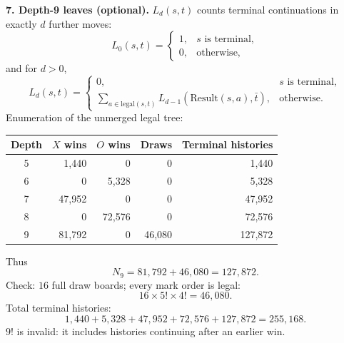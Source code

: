 \documentclass[11pt,a4paper]{article}
\begin{document}
\textbf{7. Depth-9 leaves (optional).} $L_d(s,t)$ counts terminal continuations in exactly $d$ further moves:
\[
L_0(s,t)=\begin{cases}1,&s\text{ is terminal},\\0,&\text{otherwise},\end{cases}
\]
and for $d>0$,
\[
L_d(s,t)=\begin{cases}
0,&s\text{ is terminal},\\
\displaystyle\sum_{a\in\mathrm{legal}(s,t)}L_{d-1}(\mathrm{Result}(s,a),\bar t),&\text{otherwise}.
\end{cases}
\]
Enumeration of the unmerged legal tree:
\begin{center}\begin{tabular}{c|r|r|r|r}\toprule
Depth&$X$ wins&$O$ wins&Draws&Terminal histories\\\midrule
5&1,440&0&0&1,440\\
6&0&5,328&0&5,328\\
7&47,952&0&0&47,952\\
8&0&72,576&0&72,576\\
9&81,792&0&46,080&127,872\\\bottomrule\end{tabular}\end{center}
Thus
\[
\boxed{N_9=81,792+46,080=127,872}.
\]
Check: $16$ full draw boards; every mark order is legal:
\[
16\times5!\times4!=46,080.
\]
Total terminal histories:
\[
1,440+5,328+47,952+72,576+127,872=255,168.
\]
$9!$ is invalid: it includes histories continuing after an earlier win.
\end{document}
